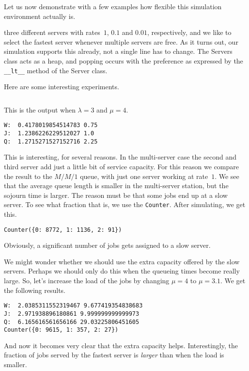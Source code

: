 \documentclass[stochastic-or.tex]{subfiles}
\begin{document}
Let us now demonstrate with a few examples how flexible this simulation environment actually is.


 three different servers with rates~$1$, $0.1$ and $0.01$, respectively, and we like to select the fastest server whenever multiple servers are free.
As it turns out, our simulation supports this already, not a single line has to change. The Servers class acts as a heap, and popping occurs with the preference as expressed by the \texttt{__lt__} method of the Server class.

Here are some interesting experiments.
\inputminted[label=multiple-speeds.py]{python}{../code/event_stacks/multiple_speeds.py}
This is the output when $\lambda=3$ and $\mu=4$.
\begin{verbatim}
W:  0.4178019854514783 0.75
J:  1.2386226229512027 1.0
Q:  1.2715271527152716 2.25
\end{verbatim}
This is interesting, for several reasons.
In the multi-server case the second and third server add just a little bit of service capacity.
For this reason we compare the result to the $M/M/1$ queue, with just one server working at rate~$1$.
We see that the average queue length is smaller in the multi-server station, but the sojourn time is larger.
The reason must be that some jobs end up at a slow server.
To see  what fraction that is, we use the \texttt{Counter}. After simulating, we get this.
\begin{verbatim}
Counter({0: 8772, 1: 1136, 2: 91})
\end{verbatim}
Obviously, a significant number of jobs gets assigned to a slow server.

We might wonder whether we should use the extra capacity offered by the slow servers.
Perhaps we should only do this when the queueing times become really large.
So, let's increase the load of the jobs by changing $\mu=4$ to  $\mu=3.1$. We get the following results.
\begin{verbatim}
W:  2.0385311552319467 9.677419354838683
J:  2.971938896180861 9.999999999999973
Q:  6.165616561656166 29.03225806451605
Counter({0: 9615, 1: 357, 2: 27})
\end{verbatim}
And now it becomes very clear that the extra capacity helps. Interestingly, the fraction of jobs served by the fastest server is \emph{larger} than when the load is smaller.
\end{document}
